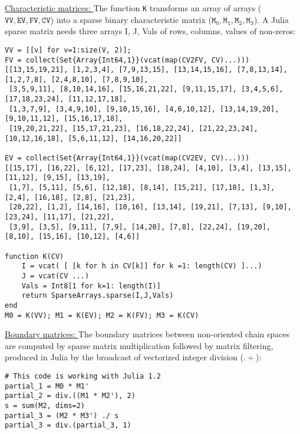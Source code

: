 \vspace{10pt}
\noindent\underline{
Characteristic matrices:
}\vspace{0.2em}\newline 
The function \texttt{K} transforms an array of arrays ($\mathtt{VV, EV, FV, CV}$) into a sparse binary characteristic matrix
($\mathtt{M_0, M_1, M_2, M_3}$). A Julia sparse matrix needs three arrays I, J, Vals of rows, columns, values of non-zeros:

\begin{Verbatim}[fontsize=\footnotesize]
VV = [[v] for v=1:size(V, 2)];
FV = collect(Set{Array{Int64,1}}(vcat(map(CV2FV, CV)...)))
[[13,15,19,21], [1,2,3,4], [7,9,13,15], [13,14,15,16], [7,8,13,14], [1,2,7,8], [2,4,8,10], [7,8,9,10], 
 [3,5,9,11], [8,10,14,16], [15,16,21,22], [9,11,15,17], [3,4,5,6], [17,18,23,24], [11,12,17,18], 
 [1,3,7,9], [3,4,9,10], [9,10,15,16], [4,6,10,12], [13,14,19,20], [9,10,11,12], [15,16,17,18], 
 [19,20,21,22], [15,17,21,23], [16,18,22,24], [21,22,23,24], [10,12,16,18], [5,6,11,12], [14,16,20,22]]

EV = collect(Set{Array{Int64,1}}(vcat(map(CV2EV, CV)...)))
[[15,17], [16,22], [6,12], [17,23], [18,24], [4,10], [3,4], [13,15], [11,12], [9,15], [13,19],
 [1,7], [5,11], [5,6], [12,18], [8,14], [15,21], [17,18], [1,3], [2,4], [16,18], [2,8], [21,23],
 [20,22], [1,2], [14,16], [10,16], [13,14], [19,21], [7,13], [9,10], [23,24], [11,17], [21,22],
 [3,9], [3,5], [9,11], [7,9], [14,20], [7,8], [22,24], [19,20], [8,10], [15,16], [10,12], [4,6]]

function K(CV)
    I = vcat( [ [k for h in CV[k]] for k =1: length(CV) ]...)
    J = vcat(CV ...)
    Vals = Int8[1 for k=1: length(I)]
    return SparseArrays.sparse(I,J,Vals)
end
M0 = K(VV); M1 = K(EV); M2 = K(FV); M3 = K(CV)
\end{Verbatim}

\vspace{10pt}
\noindent\underline{
Boundary matrices:
}\vspace{0.2em}\newline 
The boundary matrices between non-oriented chain spaces are computed by sparse matrix multiplication
followed by matrix filtering, produced in Julia by the broadcast of vectorized integer division ($.\div$):

%
%


\begin{Verbatim}[fontsize=\footnotesize]
# This code is working with Julia 1.2
partial_1 = M0 * M1'  
partial_2 = div.((M1 * M2'), 2)
s = sum(M2, dims=2)
partial_3 = (M2 * M3') ./ s
partial_3 = div.(partial_3, 1)
\end{Verbatim}

